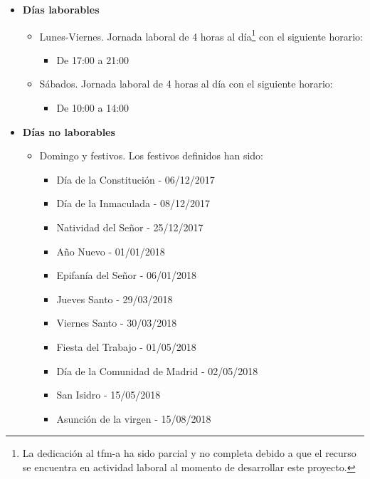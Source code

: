 \documentclass[12pt,a4paper, twoside]{report}
\begin{document}
	\begin{itemize}
		\item \textbf{Días laborables}
		\begin{itemize}
			\item Lunes-Viernes. Jornada laboral de 4 horas al día\footnote{La dedicación al \gls{tfm-a} ha sido parcial y no completa debido a que el recurso se encuentra en actividad laboral al momento de desarrollar este proyecto.} con el siguiente horario:
			\begin{itemize}
				\item De 17:00 a 21:00
			\end{itemize}
			\item Sábados. Jornada laboral de 4 horas al día con el siguiente horario:
			\begin{itemize}
				\item De 10:00 a 14:00
			\end{itemize}
		\end{itemize}
		
		\newpage
		\item \textbf{Días no laborables} 
		\begin{itemize}
			\item Domingo y festivos. Los festivos definidos han sido:
			\begin{multicols}{2}
				\begin{itemize}
					\item Día de la Constitución - 06/12/2017
					\item Día de la Inmaculada - 08/12/2017
					\item Natividad del Señor - 25/12/2017
					\item Año Nuevo - 01/01/2018
					\item Epifanía del Señor - 06/01/2018
					\item Jueves Santo - 29/03/2018
					\item Viernes Santo - 30/03/2018
					\item Fiesta del Trabajo - 01/05/2018
					\item Día de la Comunidad de Madrid - 02/05/2018
					\item San Isidro - 15/05/2018
					\item Asunción de la virgen - 15/08/2018
				\end{itemize}
			\end{multicols}
		\end{itemize}
	\end{itemize}
		 
\end{document}
